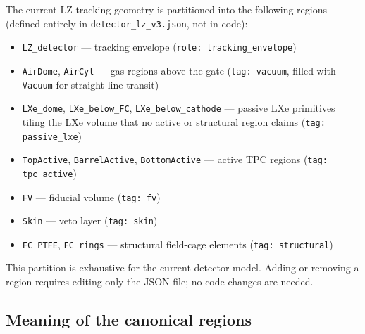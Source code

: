 \documentclass[11pt]{article}
\begin{document}
The current LZ tracking geometry is partitioned into the following regions
(defined entirely in \texttt{detector\_lz\_v3.json}, not in code):

\begin{itemize}
\item \texttt{LZ\_detector} — tracking envelope (\texttt{role: tracking\_envelope})
\item \texttt{AirDome}, \texttt{AirCyl} — gas regions above the gate (\texttt{tag: vacuum}, filled with \texttt{Vacuum} for straight-line transit)
\item \texttt{LXe\_dome}, \texttt{LXe\_below\_FC}, \texttt{LXe\_below\_cathode} — passive LXe primitives tiling the LXe volume that no active or structural region claims (\texttt{tag: passive\_lxe})
\item \texttt{TopActive}, \texttt{BarrelActive}, \texttt{BottomActive} — active TPC regions (\texttt{tag: tpc\_active})
\item \texttt{FV} — fiducial volume (\texttt{tag: fv})
\item \texttt{Skin} — veto layer (\texttt{tag: skin})
\item \texttt{FC\_PTFE}, \texttt{FC\_rings} — structural field-cage elements (\texttt{tag: structural})
\end{itemize}

This partition is exhaustive for the current detector model. Adding or removing
a region requires editing only the JSON file; no code changes are needed.

\subsection{Meaning of the canonical regions}
\end{document}
